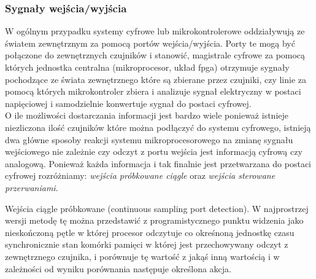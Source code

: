\subsubsection{Sygnały wejścia/wyjścia}

\par
\tab W ogólnym przypadku systemy cyfrowe lub mikrokontrolerowe oddziaływują ze światem zewnętrznym za pomocą portów wejścia/wyjścia. Porty te mogą być połączone do zewnętrznych czujników i stanowić, magistrale cyfrowe za pomocą których jednostka centralna (mikroprocesor, układ fpga) otrzymuje sygnały pochodzące ze świata zewnętrznego które są zbierane przez czujniki, czy linie za pomocą których mikrokontroler zbiera i analizuje sygnał elektryczny w postaci napięciowej i samodzielnie konwertuje sygnał do postaci cyfrowej. \\
\tab O ile możliwości dostarczania informacji jest bardzo wiele ponieważ istnieje niezliczona ilość czujników które można podłączyć do systemu cyfrowego, istnieją dwa główne sposoby reakcji systemu mikroprocesorowego na zmianę sygnału wejściowego nie zależnie czy odczyt z portu wejścia jest informacją cyfrową czy analogową. Ponieważ każda informacja i tak finalnie jest przetwarzana do postaci cyfrowej rozróżniamy: \textit{wejścia próbkowane ciągle} oraz \textit{wejścia sterowane przerwaniami}.

\par
\tab Wejścia ciągle próbkowane (continuous sampling port detection). W najprostrzej wersji metodę tę można przedstawić z programistycznego punktu widzenia jako nieskończoną pętle w której procesor odczytuje co okreśnoną jednostkę czasu synchronicznie stan komórki pamięci w której jest przechowywany odczyt z zewnętrznego czujnika, i porównuje tę wartość z jakąś inną wartością i w zależności od wyniku porównania następuje określona akcja. \\ 

